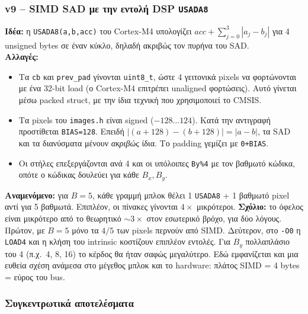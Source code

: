 \documentclass[11pt,a4paper]{article}
\newcommand{\code}[1]{\texttt{#1}}
\newcommand{\en}[1]{\foreignlanguage{english}{#1}}
\begin{document}
\subsubsection{v9 -- SIMD SAD με την εντολή DSP \code{USADA8}}
\textbf{Ιδέα:} η \code{USADA8(a,b,acc)} του \en{Cortex-M4} υπολογίζει
$acc+\sum_{j=0}^{3}|a_j-b_j|$ για 4 \en{unsigned bytes} σε έναν κύκλο, δηλαδή ακριβώς τον πυρήνα του SAD.\\
\textbf{Αλλαγές:}
\begin{itemize}[leftmargin=*]
  \item Τα \code{cb} και \code{prev\_pad} γίνονται \code{uint8\_t}, ώστε 4 γειτονικά \en{pixels} να
  φορτώνονται με ένα \en{32-bit load} (ο \en{Cortex-M4} επιτρέπει \en{unaligned} φορτώσεις). Αυτό γίνεται
  μέσω \en{packed struct}, με την ίδια τεχνική που χρησιμοποιεί το CMSIS.
  \item Τα \en{pixels} του \code{images.h} είναι \en{signed} ($-128\ldots124$). Κατά την αντιγραφή
  προστίθεται \code{BIAS=128}. Επειδή $|(a+128)-(b+128)|=|a-b|$, τα SAD και τα διανύσματα μένουν
  \emph{ακριβώς} ίδια. Το \en{padding} γεμίζει με \code{0+BIAS}.
  \item Οι στήλες επεξεργάζονται ανά 4 και οι υπόλοιπες \code{By\%4} με τον βαθμωτό κώδικα, οπότε ο κώδικας
  δουλεύει για κάθε $B_x,B_y$.
\end{itemize}
\textbf{Αναμενόμενο:} για $B=5$, κάθε γραμμή μπλοκ θέλει 1 \code{USADA8} + 1 βαθμωτό \en{pixel}
αντί για 5 βαθμωτά. Επιπλέον, οι πίνακες γίνονται $4\times$ μικρότεροι.
\textbf{Σχόλιο:} το όφελος είναι μικρότερο από το θεωρητικό $\sim$$3\times$ στον εσωτερικό βρόχο, για δύο
λόγους. Πρώτον, με $B=5$ μόνο τα $4/5$ των \en{pixels} περνούν από SIMD. Δεύτερον, στο \code{-O0} η
\code{LOAD4} και η κλήση του \en{intrinsic} κοστίζουν επιπλέον εντολές. Για $B_y$ πολλαπλάσιο του 4
(π.χ.\ 4, 8, 16) το κέρδος θα ήταν σαφώς μεγαλύτερο. Εδώ εμφανίζεται και μια ευθεία
σχέση ανάμεσα στο μέγεθος μπλοκ και το \en{hardware}: πλάτος SIMD = 4 \en{bytes} = εύρος του \en{bus}.



\subsubsection*{Συγκεντρωτικά αποτελέσματα}
\end{document}
